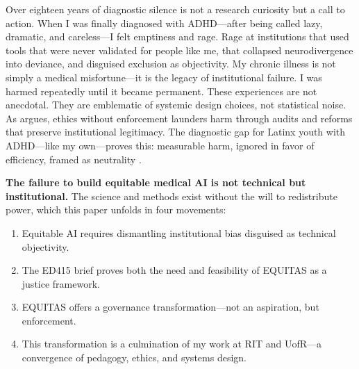 \documentclass[12pt,a4paper]{article}
\begin{document}
Over eighteen years of diagnostic silence is not a research curiosity but a call to action. When I was finally diagnosed with ADHD—after being called lazy, dramatic, and careless—I felt emptiness and rage. Rage at institutions that used tools that were never validated for people like me, that collapsed neurodivergence into deviance, and disguised exclusion as objectivity. My chronic illness is not simply a medical misfortune—it is the legacy of institutional failure. I was harmed repeatedly until it became permanent. These experiences are not anecdotal. They are emblematic of systemic design choices, not statistical noise. As \citet{Munn2023} argues, ethics without enforcement launders harm through audits and reforms that preserve institutional legitimacy. The diagnostic gap for Latinx youth with ADHD—like my own—proves this: measurable harm, ignored in favor of efficiency, framed as neutrality \citep{Marko2025, Sagona2025}.

\vspace{0.5em}
\noindent\textbf{The failure to build equitable medical AI is not technical but institutional.} The science and methods exist without the will to redistribute power, which this paper unfolds in four movements:
\begin{enumerate}
    \setlength\itemsep{0.1em}
  \item Equitable AI requires dismantling institutional bias disguised as technical objectivity.
  \item The ED415 brief proves both the need and feasibility of EQUITAS as a justice framework.
  \item EQUITAS offers a governance transformation—not an aspiration, but enforcement.
  \item This transformation is a culmination of my work at RIT and UofR—a convergence of pedagogy, ethics, and systems design.
\end{enumerate}
\end{document}
